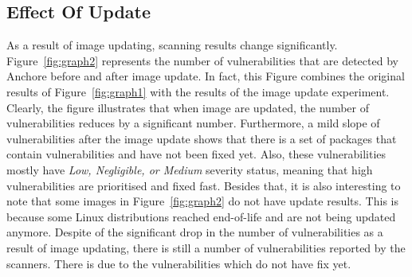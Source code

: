 \documentclass[a4paper,num-refs]{oup-contemporary}
\begin{document}
\subsection{Effect Of Update}
As a result of image updating,
scanning results change significantly.
Figure~\ref{fig:graph2} represents the number of vulnerabilities that are detected by Anchore before and after 
image update. 
In fact, this Figure combines the original results of Figure~\ref{fig:graph1} with the results of the image update
experiment.
Clearly, the figure illustrates that when image are updated, the number of vulnerabilities reduces by a
significant number. Furthermore, a mild slope of vulnerabilities after the image update shows that
there is a set of packages that contain vulnerabilities and have not been fixed yet. Also, these
vulnerabilities mostly have \textit{Low, Negligible, or Medium} severity status, meaning that
high vulnerabilities are prioritised and fixed fast.
Besides that, it is also interesting to note that some images in Figure~\ref{fig:graph2}
do not have update results. This is because some Linux distributions reached end-of-life and
are not being updated anymore.
Despite of the significant drop in the number of vulnerabilities as a result of image updating,
there is still a number of vulnerabilities reported by the scanners. There is due to the
vulnerabilities which do not have fix yet.

\end{document}
